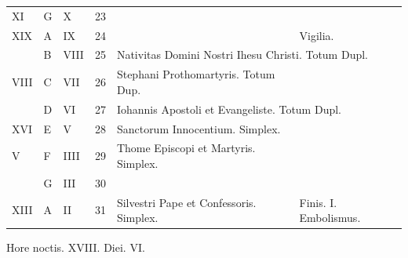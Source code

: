 \documentclass[11pt,openany]{book}
\begin{document}
\begin{center}
\begin{tabular}{l | l | l | r | l l}
\color{Red} XI & G & \color{Red} X & 23 & & \color{Red} \\
\color{Red} XIX & \color{Red} A & \color{Red} IX & 24 & & \color{Red} Vigilia. \\
\color{Red}  & B & \color{Red} VIII & 25 & \multicolumn{2}{l}{\color{Red} Nativitas Domini Nostri Ihesu Christi. Totum Dupl.} \color{Red} \\
\color{Red} VIII & C & \color{Red} VII & 26 & Stephani Prothomartyris. Totum Dup. & \color{Red} \\
\color{Red}  & D & \color{Red} VI & 27 & \multicolumn{2}{l}{\color{Red} Iohannis Apostoli et Evangeliste. Totum Dupl.} \color{Red} \\
\color{Red} XVI & E & \color{Red} V & 28 & Sanctorum Innocentium. Simplex. & \color{Red} \\
\color{Red} V & F & \color{Red} IIII & 29 & \color{Red} Thome Episcopi et Martyris. Simplex. & \color{Red} \\
\color{Red}  & G & \color{Red} III & 30 &  & \color{Red} \\
\color{Red} XIII & \color{Red} A & \color{Red} II & 31 & Silvestri Pape et Confessoris. Simplex. & \color{Red} Finis. I. Embolismus. \\
\end{tabular}
\newline \color{Red} Hore noctis. XVIII. Diei. VI.
\end{center}
\end{document}
